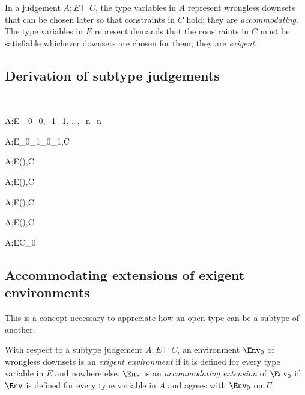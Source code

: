 \documentclass{amsart}
\theoremstyle{definition}
\begin{document}
In a judgement $A;E\vdash C$, the type variables in $A$ represent
wrongless downsets that can be chosen later so that constraints
in $C$ hold; they are \emph{accommodating}. The type variables in
$E$ represent demands that the constraints in $C$ must be
satisfiable whichever downsets are chosen for them; they are
\emph{exigent}.

\subsection{Derivation of subtype judgements}~

{A;E \vdash \tau_0\Sub\tau_0,\tau_1\Sub\tau_1,
\ldots,\tau_n\Sub\tau_n}

{A;E\vdash\sigma_0\R\sigma_1\Sub\tau_0\R\tau_1,C}


{A;E\vdash(\All\alpha\sigma)\Sub\tau,C}

{A;E\vdash\sigma\Sub(\Ex\alpha\tau),C}

{A;E\vdash(\Ex\alpha\sigma)\Sub\tau,C}

{A;E\vdash\sigma\Sub(\All\alpha\tau),C}

{A;E\vdash C_0}

\subsection{Accommodating extensions of exigent environments}
This is a concept necessary to appreciate how an open type can be
a subtype of another.

With respect to a subtype judgement $A;E\vdash C$, an environment
$\Env_0$ of wrongless downsets is an \emph{exigent environment}
if it is defined for every type variable in $E$ and nowhere else.
$\Env$ is an \emph{accommodating extension} of $\Env_0$ if $\Env$
is defined for every type variable in $A$ and agrees with
$\Env_0$ on $E$.
\end{document}
